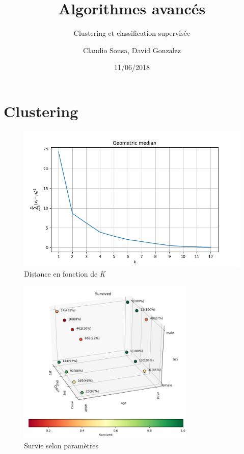 \documentclass{beamer}
\title[]{Algorithmes avancés}
\subtitle{Clustering et classification supervisée}
\author{Claudio Sousa, David Gonzalez}
\institute{HEPIA}
\date{11/06/2018}
\begin{document}
\begin{frame}[plain]
    \titlepage
\end{frame}

\section{Clustering}

\begin{frame}[plain]
    \begin{figure}[H]
        \begin{center}
            \includegraphics[width=1\textwidth]{ex1_geometric_median}
        \end{center}
        \caption{Distance en fonction de \textit{K}}
        \label{Distance en fonction de K}
    \end{figure}
\end{frame}

\begin{frame}[plain]
    \begin{figure}[H]
        \begin{center}
            \includegraphics[width=0.75\textwidth]{ex1_survived}
        \end{center}
        \caption{Survie selon paramètres}
        \label{Survie selon paramètres}
    \end{figure}
\end{frame}
\end{document}
